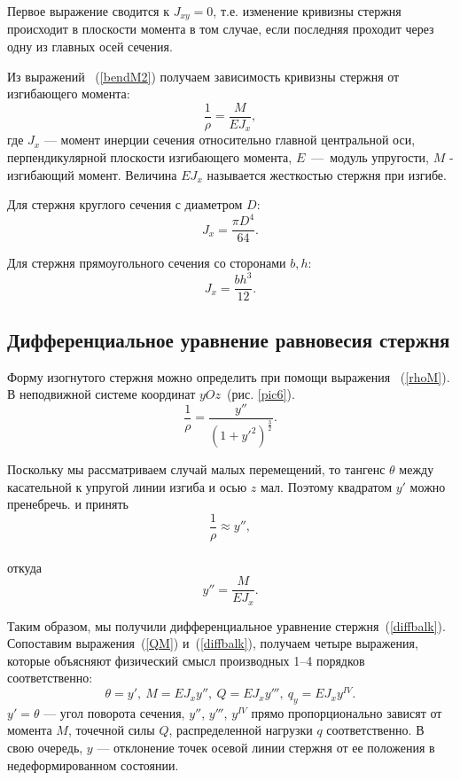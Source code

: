 \documentclass[12pt, a4paper]{article}
\begin{document}
Первое выражение сводится к $J_{xy} = 0$, т.е. изменение кривизны стержня происходит в плоскости момента в том случае, если последняя проходит через одну из главных осей сечения.

Из выражений ~(\ref{bendM2}) получаем зависимость кривизны стержня от изгибающего момента:
\begin{equation}
 	\label{rhoM}
 	\frac{1}{\rho} = \frac{M}{E J_{x}}, 
 \end{equation}
где $J_{x}$ --- момент инерции сечения относительно главной центральной оси, перпендикулярной плоскости изгибающего момента, $E$~---~модуль упругости, $M$ - изгибающий момент. Величина $E J_{x}$ называется жесткостью стержня при изгибе.

Для стержня круглого сечения с диаметром $D$:
\begin{equation}
	\label{Jround}
	J_{x} = \frac{\pi D^4}{64}.
\end{equation}

Для стержня прямоугольного сечения со сторонами $b, h$:
\begin{equation}
	\label{Jsq}
	J_{x} = \frac{b h^3}{12}.
\end{equation}

\subsection{Дифференциальное уравнение равновесия стержня}
Форму изогнутого стержня можно определить при помощи выражения ~(\ref{rhoM}). В неподвижной системе координат $yOz$~(рис. \ref{pic6}). 
\begin{equation}
	\label{diffbalkf}
	\frac{1}{\rho} = \frac{y''}{(1 + y'^2)^{\frac{3}{2}}}.
\end{equation}

Поскольку мы рассматриваем случай малых перемещений, то тангенс $ \theta$ между касательной к упругой линии изгиба и осью $z$ мал. Поэтому квадратом $y'$ можно пренебречь. и принять
\begin{equation}
	\label{diffbalkcurve}
	\frac{1}{\rho} \approx y'',
\end{equation}
\\откуда 
\begin{equation}
	\label{diffbalk}
	y'' = \frac{M}{E J_{x}}.
\end{equation}

Таким образом, мы получили дифференциальное уравнение стержня~(\ref{diffbalk}). 
Сопоставим выражения~(\ref{QM}) и~(\ref{diffbalk}), получаем четыре выражения, которые объясняют физический смысл производных 1--4 порядков соответственно:
\begin{equation}
	\label{diffbb4}
	\theta = y',~M = E J_{x} y'',~Q = E J_{x} y''',~
	q_{y} = E J_{x} y^{IV}.
\end{equation}
$y' = \theta$ --- угол поворота сечения, $y''$, $y'''$, $y^{IV}$ прямо пропорционально зависят от момента $M$, точечной силы $Q$, распределенной нагрузки $q$ соответственно. В свою очередь, $y$ --- отклонение точек осевой линии стержня от ее положения в недеформированном состоянии.
\end{document}
